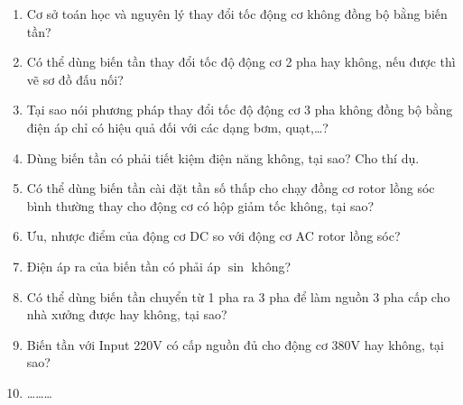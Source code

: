 \documentclass[12pt,a4paper]{article}
\begin{document}
\begin{enumerate}
	\item Cơ sở toán học và nguyên lý thay đổi tốc động cơ không đồng bộ bằng biến tần?
	
	\item Có thể dùng biến tần thay đổi tốc độ động cơ 2 pha hay không, nếu được thì vẽ sơ đồ đấu nối?
	
	\item Tại sao nói phương pháp thay đổi tốc độ động cơ 3 pha không đồng bộ bằng điện áp chỉ có hiệu quả đối với các dạng bơm, quạt,\ldots?
	
	\item Dùng biến tần có phải tiết kiệm điện năng không, tại sao? Cho thí dụ.
	
	\item Có thể dùng biến tần cài đặt tần số thấp cho chạy đồng cơ rotor lồng sóc bình thường thay cho động cơ có hộp giảm tốc không, tại sao?
	
	\item Ưu, nhược điểm của động cơ DC so với động cơ AC rotor lồng sóc?
	
	\item Điện áp ra của biến tần có phải áp $\sin$ không?

	\item Có thể dùng biến tần chuyển từ 1 pha ra 3 pha để làm nguồn 3 pha cấp cho nhà xưởng được hay không, tại sao?
	
	\item Biến tần với Input 220V có cấp nguồn đủ cho động cơ 380V hay không, tại sao?

	\item \ldots\ldots\ldots
\end{enumerate}
\end{document}

